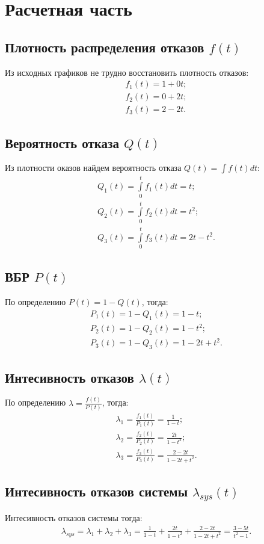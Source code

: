 \chapter{Расчетная часть}
\section{Плотность распределения отказов $f(t)$}
	Из исходных графиков не трудно восстановить плотность отказов:
	\begin{gather*}
		f_{1}(t) = 1 + 0t;\\
		f_{2}(t) = 0 + 2t;\\
		f_{3}(t) = 2 - 2t.
	\end{gather*}
\section{Вероятность отказа $Q(t)$}
	Из плотности оказов найдем вероятность отказа $Q(t) = \int f(t) dt$:
	\begin{gather*}
		Q_{1}(t) = \int\limits_{0}^{t}f_{1}(t)dt = t;\\
		Q_{2}(t) = \int\limits_{0}^{t}f_{2}(t)dt = t^{2};\\
		Q_{3}(t) = \int\limits_{0}^{t}f_{3}(t)dt = 2t - t^{2}.
	\end{gather*}
\section{ВБР $P(t)$}
	По определению $P(t) = 1 - Q(t)$, тогда:
	\begin{gather*}
		P_{1}(t) = 1 - Q_{1}(t) = 1 - t;\\
		P_{2}(t) = 1 - Q_{2}(t) = 1 - t^{2};\\
		P_{3}(t) = 1 - Q_{3}(t) = 1 - 2t + t^{2}.
	\end{gather*}
\section{Интесивность отказов $\lambda(t)$}
	По определению $\lambda = \frac{f(t)}{P(t)}$, тогда:
	\begin{gather*}
		\lambda_{1} = \frac{f_{1}(t)}{P_{1}(t)} = \frac{1}{1 - t};\\
		\lambda_{2} = \frac{f_{2}(t)}{P_{2}(t)} = \frac{2t}{1 - t^{2}};\\
		\lambda_{3} = \frac{f_{3}(t)}{P_{3}(t)} = \frac{2 - 2t}{1 - 2t + t^{2}}.
	\end{gather*}
\section{Интесивность отказов системы $\lambda_{sys}(t)$}
	Интесивность отказов системы тогда:
	\begin{gather*}
		\lambda_{sys} = \lambda_{1} + \lambda_{2} + \lambda_{3} = \frac{1}{1 - t} + \frac{2t}{1 - t^{2}} + \frac{2 - 2t}{1 - 2t + t^{2}} = \frac{3 - 5t}{t^{2} - 1}.
	\end{gather*}
